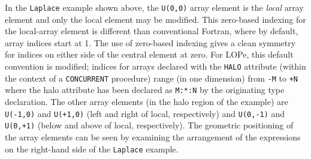 In the \texttt{Laplace} example shown above, the \texttt{U(0,0)} array
element is the \emph{local} array element and only the local element
may be modified.  This zero-based indexing for the local-array element
is different than conventional Fortran, where by default, array
indices start at 1.  The use of zero-based indexing gives a clean
symmetry for indices on either side of the central element at zero.
For LOPe, this default convention is modified; indices for arrays
declared with the \texttt{HALO} attribute (within the context of a
\texttt{CONCURRENT} procedure) range (in one dimension) from
\texttt{-M} to \texttt{+N} where the halo attribute has been declared
as \texttt{M:*:N} by the originating type declaration.  The other
array elements (in the halo region of the example) are
\texttt{U(-1,0)} and \texttt{U(+1,0)} (left and right of local,
respectively) and \texttt{U(0,-1)} and \texttt{U(0,+1)} (below and
above of local, respectively).  The geometric positioning of the array
elements can be seen by examining the arrangement of the expressions
on the right-hand side of the \texttt{Laplace} example.
